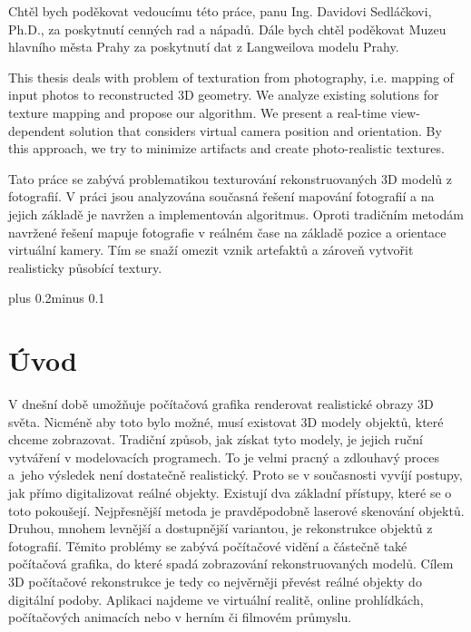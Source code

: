 \documentclass[11pt,twoside,a4paper]{book}
\begin{document}

\coverpagestarts

\acknowledgements \noindent \noindent Chtěl bych poděkovat vedoucímu této práce,
panu Ing. Davidovi Sedláčkovi, Ph.D., za poskytnutí cenných rad a nápadů. Dále bych chtěl poděkovat Muzeu hlavního města Prahy za poskytnutí dat z Langweilova modelu Prahy.

 
\abstractpage
\noindent
This thesis deals with problem of texturation from photography, i.e. mapping of input photos to reconstructed 3D geometry. We analyze existing solutions for texture mapping and propose our algorithm. We present a real-time view-dependent solution that considers virtual camera position and orientation. By this approach, we try to minimize artifacts and create photo-realistic textures.


 \baselineskip
\noindent
Tato práce se zabývá problematikou texturování rekonstruovaných 3D modelů z fotografií. V práci jsou analyzována současná řešení mapování fotografií a na jejich základě je navržen a implementován algoritmus. Oproti tradičním metodám navržené řešení mapuje fotografie v reálném čase na základě pozice a orientace virtuální kamery. Tím se snaží omezit vznik artefaktů a zároveň vytvořit realisticky působící textury.


\tableofcontents

\listoffigures

\listoftables

\renewcommand*{\lstlistlistingname}{Seznam zdrojových kódů}
\lstlistoflistings

\mainbodystarts
\normalfont {}\baselineskip plus 0.2\baselineskip minus
0.1\baselineskip


\chapter{Úvod}
V dnešní době umožňuje počítačová grafika renderovat realistické obrazy 3D
světa. Nicméně aby toto bylo možné, musí existovat 3D modely objektů, které
chceme zobrazovat. Tradiční způsob, jak získat tyto modely, je jejich ruční
vytváření v modelovacích programech. To je velmi pracný a zdlouhavý proces
a~jeho výsledek není dostatečně realistický. Proto se v současnosti vyvíjí
postupy, jak přímo digitalizovat reálné objekty. Existují dva základní přístupy,
které se o toto pokoušejí. Nejpřesnější metoda je pravděpodobně laserové
skenování objektů. Druhou, mnohem levnější a dostupnější variantou, je rekonstrukce objektů z
fotografií. Těmito problémy se zabývá počítačové vidění a částečně také
počítačová grafika, do které spadá zobrazování rekonstruovaných modelů. Cílem 3D
počítačové rekonstrukce je tedy co nejvěrněji převést reálné objekty do
digitální podoby. Aplikaci najdeme ve virtuální realitě, online prohlídkách,
počítačových animacích nebo v herním či filmovém průmyslu.
\end{document}
